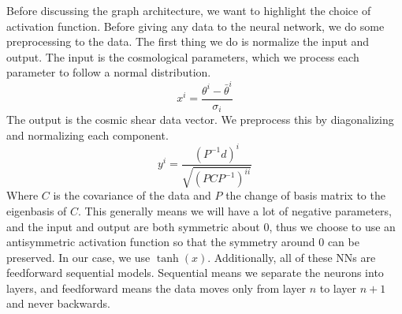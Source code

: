 Before discussing the graph architecture, we want to highlight the choice of activation function. Before giving any data to the neural network, we do some preprocessing to the data. The first thing we do is normalize the input and output. The input is the cosmological parameters, which we process each parameter to follow a normal distribution.
\begin{equation}
	x^i = \frac{\theta^i - \bar\theta^i}{\sigma_i}
\end{equation}
The output is the cosmic shear data vector. We preprocess this by diagonalizing and normalizing each component.
\begin{equation}
	y^i = \frac{ (P^{-1}d)^i }{\sqrt{(PCP^{-1})^{ii}}}
\end{equation}
Where $C$ is the covariance of the data and $P$ the change of basis matrix to the eigenbasis of $C$. This generally means we will have a lot of negative parameters, and the input and output are both symmetric about 0, thus we choose to use an antisymmetric activation function so that the symmetry around 0 can be preserved. In our case, we use $\tanh(x)$. Additionally, all of these NNs are feedforward sequential models. Sequential means we separate the neurons into layers, and feedforward means the data moves only from layer $n$ to layer $n+1$ and never backwards.
